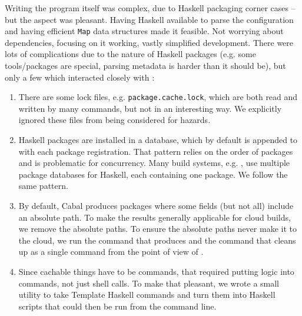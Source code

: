 Writing the program itself was complex, due to Haskell packaging corner cases -- but the \Rattle aspect was pleasant. Having Haskell available to parse the configuration and having efficient \texttt{Map} data structures made it feasible. Not worrying about dependencies, focusing on it working, vastly simplified development. There were lots of complications due to the nature of Haskell packages (e.g. some tools/packages are special, parsing metadata is harder than it should be), but only a few which interacted closely with \Rattle:

\begin{enumerate}
\item There are some lock files, e.g. \texttt{package.cache.lock}, which are both read and written by many commands, but not in an interesting way. We explicitly ignored these files from being considered for hazards.
\item Haskell packages are installed in a database, which by default is appended to with each package registration. That pattern relies on the order of packages and is problematic for concurrency. Many build systems, e.g. \Bazel \cite{bazel}, use multiple package databases for Haskell, each containing one package. We follow the same pattern.
\item By default, Cabal produces packages where some fields (but not all) include an absolute path. To make the results generally applicable for cloud builds, we remove the absolute paths. To ensure the absolute paths never make it to the cloud, we run the command that produces and the command that cleans up as a single command from the point of view of \Rattle.
\item Since cachable things have to be commands, that required putting logic into commands, not just shell calls. To make that pleasant, we wrote a small utility to take Template Haskell commands \cite{template_haskell} and turn them into Haskell scripts that could then be run from the command line.
\end{enumerate}
